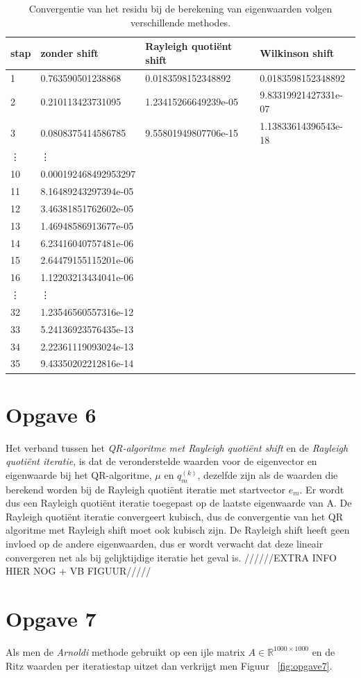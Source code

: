 \documentclass[a4paper]{article}
\newcommand{\opgave}[1]{\section*{Opgave #1}}
\begin{document}
\begin{table}[h]
\begin{tabular}{|l|l|l|l|}
\hline
stap & zonder shift & Rayleigh quoti\"{e}nt shift & Wilkinson shift \\
\hline
1 & 0.763590501238868 & 0.0183598152348892 & 0.0183598152348892 \\
2 & 0.210113423731095 & 1.23415266649239e-05 & 9.83319921427331e-07 \\
3 & 0.0808375414586785 & 9.55801949807706e-15 & 1.13833614396543e-18 \\
\vdots & \vdots &  &  \\
10 & 0.000192468492953297 &  &  \\
11 & 8.16489243297394e-05 &  &  \\
12 & 3.46381851762602e-05 &  &  \\
13 & 1.46948586913677e-05 &  &  \\
14 & 6.23416040757481e-06 &  &  \\
15 & 2.64479155115201e-06 &  &  \\
16 & 1.12203213434041e-06 &  &  \\
\vdots & \vdots &  &  \\
32 & 1.23546560557316e-12 &  &  \\
33 & 5.24136923576435e-13 &  &  \\
34 & 2.22361119093024e-13 &  &  \\
35 & 9.43350202212816e-14 &  &  \\
\hline
\end{tabular}
\caption{Convergentie van het residu bij de berekening van eigenwaarden volgen verschillende methodes.}
\label{table:tab2}
\end{table}
\opgave{6}
Het verband tussen het \textit{QR-algoritme met Rayleigh quoti\"{e}nt shift} en de \textit{Rayleigh quoti\"{e}nt iteratie}, is dat de veronderstelde waarden voor de eigenvector
en eigenwaarde bij het QR-algoritme, $\mu$ en $q_m^{(k)}$, dezelfde zijn als de waarden
die berekend worden bij de Rayleigh quoti\"{e}nt iteratie met startvector $e_m$. Er wordt dus een Rayleigh quoti\"{e}nt iteratie toegepast op de laatste eigenwaarde van
A. De Rayleigh quoti\"{e}nt iteratie convergeert kubisch, dus de convergentie van het QR algoritme met Rayleigh shift moet ook kubisch zijn. De Rayleigh shift heeft geen invloed op de andere eigenwaarden, dus er wordt verwacht dat deze lineair convergeren net als bij gelijktijdige iteratie het geval is.
//////EXTRA INFO HIER NOG + VB FIGUUR/////
\opgave{7}
Als men de \textit{Arnoldi} methode gebruikt op een ijle matrix $A \in \mathbb{R}^{1000\times1000}$ en de Ritz waarden per iteratiestap uitzet dan verkrijgt men Figuur ~\ref{fig:opgave7}.
\end{document}
